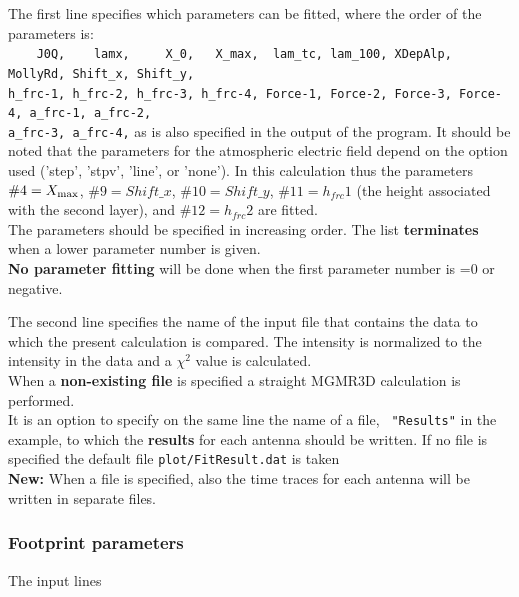 \documentclass[pdftex,dvipsnames,usenames,fleqn,12pt]{article}
\newcommand*{\seclab}[1]{\label{sec:#1}}
\newcommand{\RED}{\color[named]{Red}}
\def\Xmax{X_{\rm max}}
\newcommand{\Added}[2]{{\marginpar{\RED \bf #1}\RED\bf #2}}
\begin{document}
The first line specifies which parameters can be fitted, where the order of the parameters is:
\\\verb<    J0Q,    lamx,     X_0,   X_max,  lam_tc, lam_100, XDepAlp, MollyRd, Shift_x, Shift_y,<
\\\verb<h_frc-1, h_frc-2, h_frc-3, h_frc-4, Force-1, Force-2, Force-3, Force-4, a_frc-1, a_frc-2,<
\\\verb<a_frc-3, a_frc-4,<
as is also specified in the output of the program. It should be noted that the parameters for the atmospheric electric field depend on the option used ('step', 'stpv', 'line', or 'none'). In this calculation thus the  parameters $\#4=\Xmax$, $\#9=Shift\_x$, $\#10=Shift\_y$, $\#11=h_{frc}1$ (the height associated with the second layer), and $\#12=h_{frc}2$ are fitted.
\\The parameters should be specified in increasing order. The list {\bf terminates} when a lower parameter number is given.
\\{\bf No parameter fitting} will be done when the first parameter number is =0 or negative.

The second line specifies the name of the input file that contains the data to which the present calculation is compared. The intensity is normalized to the intensity in the data and a $\chi^2$ value is calculated.
\\When a {\bf non-existing file} is specified a straight MGMR3D calculation is performed.
\\It is an option to specify on the same line the name of a file, \verb< "Results"< in the example, to which the {\bf results} for each antenna should be written. If no file is specified the default file \verb<plot/FitResult.dat< is taken
\\\Added{28/10/'18}{New:} When a file is specified, also the time traces for each antenna will be written in separate files.

\subsubsection{Footprint parameters}\seclab{FoPrPar}

The input lines
\end{document}

